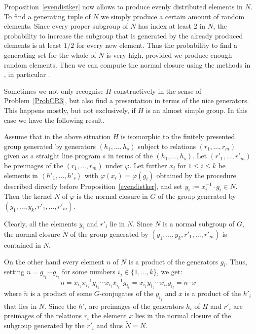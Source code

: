\smallskip
Proposition~\ref{evendistker} now allows to produce evenly distributed
elements in $N$. To find a generating tuple of $N$ we simply produce
a certain amount of random elements. Since every proper subgroup of $N$ 
has index at least $2$ in $N$, the probability to increase the
subgroup that is generated by the already produced elements is at least 
$1/2$ for every new element. Thus the probability to find a generating
set for the whole of $N$ is very high, provided we produce enough random
elements. Then we can compute the normal closure using
the methods in \cite[Chapter 2]{Ser}, in particular
\cite[Theorem~2.3.9]{Ser}.


\medskip
Sometimes we not only recognise $H$ constructively in the sense of
Problem~\ref{ProbCR3}, but also find a presentation in terms of the 
nice generators. This happens mostly, but not exclusively, if $H$ is an 
almost simple group. In this case we have the following result.

\begin{Prop}
\label{kernelpres}
Assume that in the above situation $H$ is isomorphic to the
finitely presented group generated by generators $(h_1, \ldots, h_s)$
subject to relations $(r_1, \ldots, r_m)$ given as a straight line
%
program $s$ in terms of the $(h_1, \ldots, h_s)$. Let $(r'_1, \ldots,
r'_m)$ be preimages of the $(r_1, \ldots, r_m)$ under $\varphi$. 
Let further $x_i$ for $1 \le i \le k$ be elements in $\left< h'_1, \ldots, 
h'_s \right>$ with $\varphi(x_i) = \varphi(g_i)$ obtained by the procedure 
described directly before Proposition~\ref{evendistker}, and set 
$y_i := x_i^{-1} \cdot g_i \in N$. Then the kernel $N$ of
$\varphi$ is the normal closure in $G$ of the group generated by
$(y_1, \ldots, y_k, r'_1, \ldots, r'_m)$.
\end{Prop}
\proofbeg
Clearly, all the elements $y_i$ and $r'_i$ lie in $N$. Since $N$ is a
normal subgroup of $G$, the normal closure $\tilde N$ of the group generated
by $(y_1, \ldots, y_k, r'_1, \ldots, r'_m)$ is contained in $N$.

On the other hand every element $n$ of $N$ is a product of the generators
$g_i$. Thus, setting $n = g_{i_1} \cdots g_{i_t}$ for some numbers
$i_j \in \{ 1, \ldots, k \}$, we get:
\[ n = x_{i_1} x_{i_1}^{-1} g_{i_1} \cdots x_{i_t} x_{i_t}^{-1} g_{i_t}
     = x_{i_1} y_{i_1} \cdots x_{i_t} y_{i_t}
     = \tilde n \cdot x \]
where $\tilde n$ is a product of some $G$-conjugates of the $y_{i_j}$
and $x$ is a product of the $h'_i$ that lies in $N$. Since the $h'_i$
are preimages of the generators $h_i$ of $H$ and $r'_i$ are preimages
of the relations $r_i$ the element $x$ lies in the normal closure
of the subgroup generated by the $r'_i$ and thus $\tilde N = N$.
\proofend


